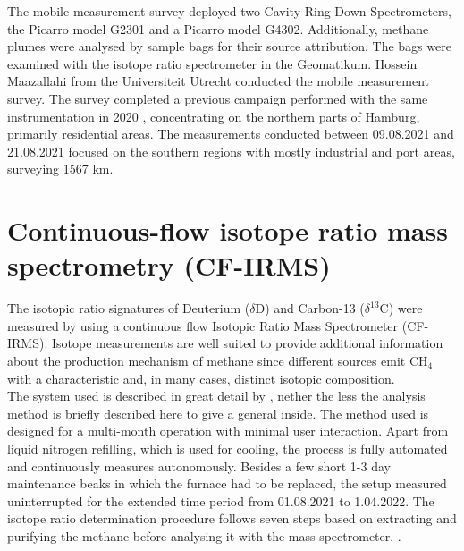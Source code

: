 The mobile measurement survey deployed two Cavity Ring-Down Spectrometers, the Picarro model G2301 and a Picarro model G4302. Additionally, methane plumes were analysed by sample bags for their source attribution. The bags were examined with the isotope ratio spectrometer in the Geomatikum. Hossein Maazallahi from the Universiteit Utrecht conducted the mobile measurement survey. The survey completed a previous campaign performed with the same instrumentation in 2020 \cite{Maazallahi.2020}, concentrating on the northern parts of Hamburg, primarily residential areas. The measurements conducted between 09.08.2021 and 21.08.2021 focused on the southern regions with mostly industrial and port areas, surveying 1567 km.

\section{Continuous-flow isotope ratio mass spectrometry (CF-IRMS)}
The isotopic ratio signatures of Deuterium ($\delta$D) and Carbon-13 ($\delta ^{13}$C) were measured by using a continuous flow Isotopic Ratio Mass Spectrometer (CF-IRMS).  Isotope measurements are well suited to provide additional information about the production mechanism of methane since different sources emit CH$_4$ with a characteristic and, in many cases, distinct isotopic composition.\\
The system used is described in great detail by \cite{Brass.2010}, nether the less the analysis method is briefly described here to give a general inside. The method used is designed for a multi-month operation with minimal user interaction. Apart from liquid nitrogen refilling, which is used for cooling, the process is fully automated and continuously measures autonomously. Besides a few short 1-3 day maintenance beaks in which the furnace had to be replaced, the setup measured uninterrupted for the extended time period from 01.08.2021 to 1.04.2022. The isotope ratio determination procedure follows seven steps based on extracting and purifying the methane before analysing it with the mass spectrometer. \cite{Brass.2010}.
